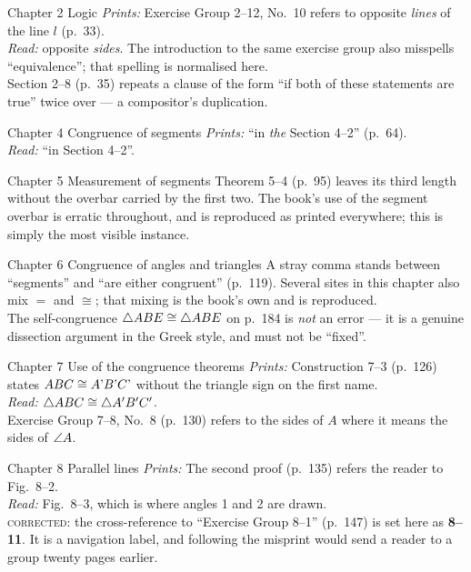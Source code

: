 \documentclass[11pt]{book}
\newcommand{\ERprints}[1]{\emph{Prints:} #1}
\newcommand{\ERmeans}[1]{\emph{Read:} #1}
\begin{document}
\begin{erratalist}

\item[Chapter 2 \quad Logic]
\ERprints{Exercise Group 2--12, No.~10 refers to opposite \emph{lines} of the
line $l$ (p.~33).}\\
\ERmeans{opposite \emph{sides}.} The introduction to the same exercise group
also misspells ``equivalence''; that spelling is normalised here.\\
Section 2--8 (p.~35) repeats a clause of the form ``if both of these
statements are true'' twice over --- a compositor's duplication.

\item[Chapter 4 \quad Congruence of segments]
\ERprints{``in \emph{the} Section 4--2'' (p.~64).}\\
\ERmeans{``in Section 4--2''.}

\item[Chapter 5 \quad Measurement of segments]
Theorem 5--4 (p.~95) leaves its third length without the overbar carried by
the first two. The book's use of the segment overbar is erratic throughout,
and is reproduced as printed everywhere; this is simply the most visible
instance.

\item[Chapter 6 \quad Congruence of angles and triangles]
A stray comma stands between ``segments'' and ``are either congruent''
(p.~119). Several sites in this chapter also mix $=$ and $\cong$; that
mixing is the book's own and is reproduced.\\
The self-congruence $\triangle ABE \cong \triangle ABE$ on p.~184 is \emph{not} an
error --- it is a genuine dissection argument in the Greek style, and must
not be ``fixed''.

\item[Chapter 7 \quad Use of the congruence theorems]
\ERprints{Construction 7--3 (p.~126) states $ABC \cong A\text{\textup{'}}B\text{\textup{'}}C\text{\textup{'}}$
without the triangle sign on the first name.}\\
\ERmeans{$\triangle ABC \cong \triangle A'B'C'$.}\\
Exercise Group 7--8, No.~8 (p.~130) refers to the sides of $A$ where it means
the sides of $\angle A$.

\item[Chapter 8 \quad Parallel lines]
\ERprints{The second proof (p.~135) refers the reader to Fig.~8--2.}\\
\ERmeans{Fig.~8--3, which is where angles 1 and 2 are drawn.}\\
\textsc{corrected}: the cross-reference to ``Exercise Group 8--1'' (p.~147)
is set here as \textbf{8--11}. It is a navigation label, and following the
misprint would send a reader to a group twenty pages earlier.


\end{erratalist}
\end{document}
